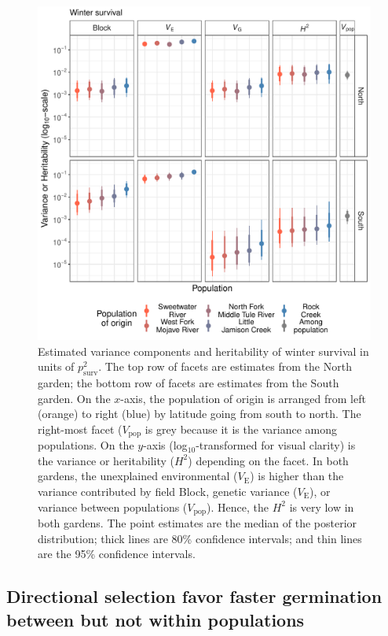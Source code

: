 \documentclass[
  12pt,
]{article}
\begin{document}
\begin{figure}[ht]
  \includegraphics[width=\textwidth]{figures/h2-surv.pdf}
  \caption{Estimated variance components and heritability of winter survival in units of $p^2_\text{surv}$. The top row of facets are estimates from the North garden; the bottom row of facets are estimates from the South garden. On the $x$-axis, the population of origin is arranged from left (orange) to right (blue) by latitude going from south to north. The right-most facet ($V_\text{pop}$ is grey because it is the variance among populations. On the $y$-axis (log$_{10}$-transformed for visual clarity) is the variance or heritability ($H^2$) depending on the facet. In both gardens, the unexplained environmental ($V_\text{E}$) is higher than the variance contributed by field Block, genetic variance ($V_\text{E}$), or variance between populations ($V_\text{pop}$). Hence, the $H^2$ is very low in both gardens. The point estimates are the median of the posterior distribution; thick lines are 80\% confidence intervals; and thin lines are the 95\% confidence intervals.}
  \label{fig:h2-surv}
\end{figure}

\hypertarget{directional-selection-favor-faster-germination-between-but-not-within-populations}{%
\subsection{Directional selection favor faster germination between but not within populations}\label{directional-selection-favor-faster-germination-between-but-not-within-populations}}
\end{document}
